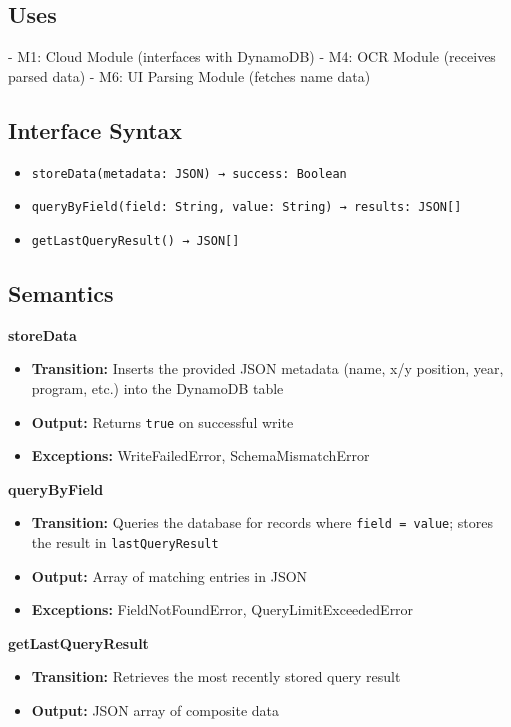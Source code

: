 \documentclass[12pt, titlepage]{article}
\begin{document}
\subsection*{Uses}
- M1: Cloud Module (interfaces with DynamoDB)
- M4: OCR Module (receives parsed data)
- M6: UI Parsing Module (fetches name data)

\subsection*{Interface Syntax}
\begin{itemize}
  \item \texttt{storeData(metadata: JSON) → success: Boolean}
  \item \texttt{queryByField(field: String, value: String) → results: JSON[]}
  \item \texttt{getLastQueryResult() → JSON[]}
\end{itemize}

\subsection*{Semantics}

\textbf{storeData}
\begin{itemize}
  \item \textbf{Transition:} Inserts the provided JSON metadata (name, x/y position, year, program, etc.) into the DynamoDB table
  \item \textbf{Output:} Returns \texttt{true} on successful write
  \item \textbf{Exceptions:} WriteFailedError, SchemaMismatchError
\end{itemize}

\textbf{queryByField}
\begin{itemize}
  \item \textbf{Transition:} Queries the database for records where \texttt{field = value}; stores the result in \texttt{lastQueryResult}
  \item \textbf{Output:} Array of matching entries in JSON
  \item \textbf{Exceptions:} FieldNotFoundError, QueryLimitExceededError
\end{itemize}

\textbf{getLastQueryResult}
\begin{itemize}
  \item \textbf{Transition:} Retrieves the most recently stored query result
  \item \textbf{Output:} JSON array of composite data
\end{itemize}
\end{document}
